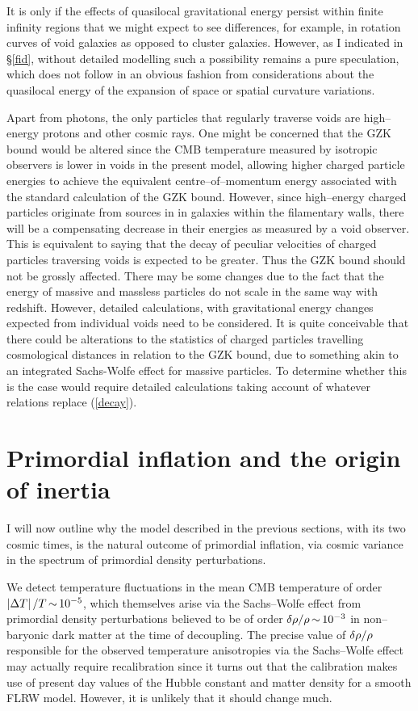 \documentclass[12pt]{article}
\begin{document}
It is only if the effects of quasilocal gravitational energy
persist within finite infinity regions that we might expect to see
differences, for example, in rotation curves of void galaxies as opposed
to cluster galaxies. However, as I indicated in \S\ref{fid}, without
detailed modelling such a possibility remains a pure speculation, which
does not follow in an obvious fashion from considerations about
the quasilocal energy of the expansion of space or spatial curvature
variations.

Apart from photons, the only particles that regularly traverse voids are
high--energy protons and other cosmic rays. One might be concerned that the
GZK bound \cite{gzk} would be altered since the CMB temperature measured
by isotropic observers is lower in voids in the present model, allowing
higher charged particle energies to achieve the equivalent
centre--of--momentum energy associated with the standard calculation of
the GZK bound. However, since high--energy charged particles originate
from sources in in galaxies within the filamentary walls, there will be a
compensating decrease in their energies as measured by a void observer. This
is equivalent to saying that the decay of peculiar velocities of charged
particles traversing voids is expected to be greater. Thus the GZK bound
should not be grossly affected. There may be some changes due to the fact
that the energy of massive and massless particles do not scale in the
same way with redshift. However, detailed calculations, with gravitational
energy changes expected from individual voids need to be considered. It is
quite conceivable that there could be alterations to the statistics of
charged particles travelling cosmological distances in relation to the GZK
bound, due to something akin to an integrated Sachs-Wolfe effect for massive
particles. To determine whether this is the case would require detailed
calculations taking account of whatever relations replace (\ref{decay}).

\section{Primordial inflation and the origin of inertia
\label{inflation}}

I will now outline why the model described in the previous sections, with
its two cosmic times, is the natural outcome of primordial inflation, via
cosmic variance in the spectrum of primordial density perturbations.

We detect temperature fluctuations in the mean CMB temperature of order
$\left|\Delta T\right|/T\mathop{\sim}\limits10^{-5}$, which themselves arise via the
Sachs--Wolfe effect from primordial density perturbations believed to be of
order $\delta\rho/\rho\mathop{\sim}\limits10^{-3}$ in non--baryonic dark matter at the time of
decoupling. The precise value of $\delta\rho/\rho$ responsible for the observed
temperature anisotropies via the Sachs--Wolfe effect may actually require
recalibration since it turns out that the calibration makes use of
present day values of the Hubble constant and matter density for a
smooth FLRW model. However, it is unlikely that it should change much.
\end{document}
